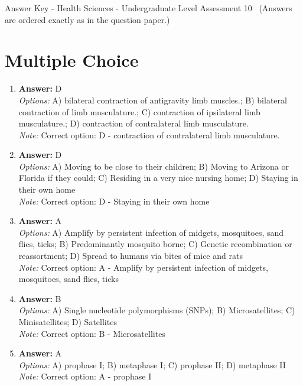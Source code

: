 \documentclass[12pt]{article}
\begin{document}
\begin{center}
Answer Key - Health Sciences - Undergraduate Level Assessment 10 \
\small (Answers are ordered exactly as in the question paper.)
\end{center}

\section*{Multiple Choice}
\begin{enumerate}[label=\arabic*.]
\item \textbf{Answer:} D
\\ \textit{Options:} A) bilateral contraction of antigravity limb muscles.; B) bilateral contraction of limb musculature.; C) contraction of ipsilateral limb musculature.; D) contraction of contralateral limb musculature.
\\ \textit{Note:} Correct option: D - contraction of contralateral limb musculature.
\item \textbf{Answer:} D
\\ \textit{Options:} A) Moving to be close to their children; B) Moving to Arizona or Florida if they could; C) Residing in a very nice nursing home; D) Staying in their own home
\\ \textit{Note:} Correct option: D - Staying in their own home
\item \textbf{Answer:} A
\\ \textit{Options:} A) Amplify by persistent infection of midgets, mosquitoes, sand flies, ticks; B) Predominantly mosquito borne; C) Genetic recombination or reassortment; D) Spread to humans via bites of mice and rats
\\ \textit{Note:} Correct option: A - Amplify by persistent infection of midgets, mosquitoes, sand flies, ticks
\item \textbf{Answer:} B
\\ \textit{Options:} A) Single nucleotide polymorphisms (SNPs); B) Microsatellites; C) Minisatellites; D) Satellites
\\ \textit{Note:} Correct option: B - Microsatellites
\item \textbf{Answer:} A
\\ \textit{Options:} A) prophase I; B) metaphase I; C) prophase II; D) metaphase II
\\ \textit{Note:} Correct option: A - prophase I
\end{enumerate}
\end{document}
